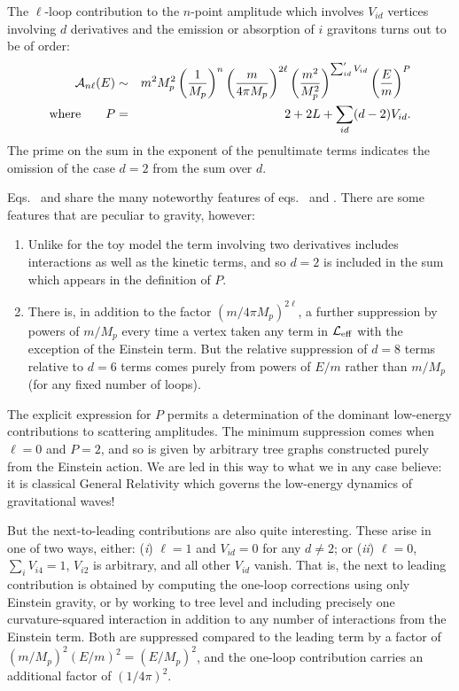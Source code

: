 The $\ell$-loop contribution to the $n$-point amplitude which
involves $V_{id}$ vertices involving $d$ derivatives and
the emission or absorption of $i$ gravitons turns
out to be of order:
%
\begin{eqnarray}
\label{GRcount1}
{\cal A}_{n\ell}(E) &\sim& m^2 M_p^2 \left( {1 \over M_p}
\right)^n \left( {m \over 4 \pi M_p} \right)^{2 \ell} 
\left( {m^2 \over M_p^2} \right)^{\sum_{id}' V_{id}}
\left( {E \over m} \right)^P \nonumber\\
\hbox{where} \qquad P &=& 2 + 2L + \sum_{id}
(d-2) V_{id}.
\label{GRcount2}
\end{eqnarray}
%
The prime on the sum in the exponent of the penultimate
terms indicates the omission of the case $d=2$ from 
the sum over $d$. 

Eqs.~ and  share
the many noteworthy features of eqs.~
and . There are some features that are
peculiar to gravity, however:

\begin{enumerate}
\item
Unlike for the toy model the term involving
two derivatives includes interactions as well as the kinetic
terms, and so $d=2$ is included in the sum which appears
in the definition of $P$. 
%
\item
There is, in addition to the factor $(m/4 \pi M_p)^{2\ell}$,
a further suppression by powers of $m/M_p$ every time
a vertex taken any term in ${\cal L}_{\rm eff}$ with
the exception of the Einstein term. But the relative
suppression of $d = 8$ terms relative to $d=6$ terms
comes purely from powers of $E/m$ rather than
$m/M_p$ (for any fixed number of loops). 
%
\end{enumerate}

The explicit expression for $P$ permits a determination
of the dominant low-energy contributions to scattering
amplitudes. The minimum suppression comes when
$\ell = 0$ and $P = 2$, and so is given by arbitrary
tree graphs constructed purely from the Einstein action.
We are led in this way to what we in any case believe:
it is classical General Relativity which governs the 
low-energy dynamics of gravitational waves!

But the next-to-leading contributions are also quite
interesting. These arise in one of two ways, either:
({\it i}) $\ell = 1$ and $V_{id} = 0$ for any $d\ne 2$;
or ({\it ii}) $\ell = 0$, $\sum_i V_{i4} = 1$, 
$V_{i2}$ is arbitrary, and all other $V_{id}$ vanish.
That is, the next to leading contribution is obtained by
computing the one-loop corrections using only Einstein
gravity, or by working to tree level and including precisely
one curvature-squared interaction in addition to any
number of interactions from the Einstein term. Both
are suppressed compared to the leading term by a factor
of $(m/M_p)^2(E/m)^2 = (E/M_p)^2$, and the one-loop
contribution carries an additional factor of $(1/4\pi)^2$. 

